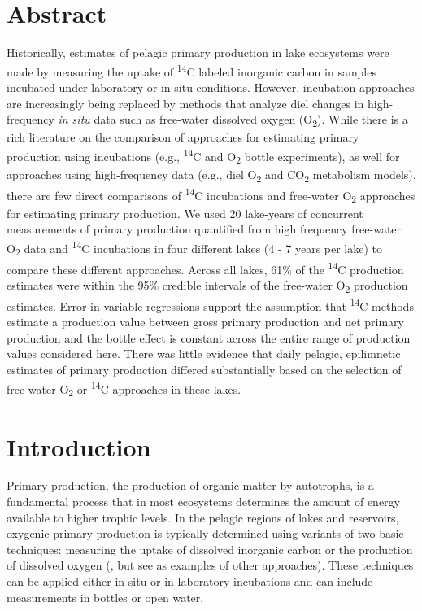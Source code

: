 \documentclass[12pt, oneside]{article}
\begin{document}
\section*{Abstract}
Historically, estimates of pelagic primary production in lake ecosystems were made by measuring the uptake of \textsuperscript{14}C labeled inorganic carbon in samples incubated under laboratory or in situ conditions. However, incubation approaches are increasingly being replaced by methods that analyze diel changes in high-frequency \emph{in situ} data such as free-water dissolved oxygen (O\textsubscript{2}). While there is a rich literature on the comparison of approaches for estimating primary production using incubations (e.g., \textsuperscript{14}C and O\textsubscript{2} bottle experiments), as well for approaches using high-frequency data (e.g., diel O\textsubscript{2} and CO\textsubscript{2} metabolism models), there are few direct comparisons of \textsuperscript{14}C incubations and free-water O\textsubscript{2} approaches for estimating primary production. We used 20 lake-years of concurrent measurements of primary production quantified from high frequency free-water O\textsubscript{2} data and \textsuperscript{14}C incubations in four different lakes (4 - 7 years per lake) to compare these different approaches. Across all lakes, 61\% of the \textsuperscript{14}C production estimates were within the 95\% credible intervals of the free-water O\textsubscript{2} production estimates. Error-in-variable regressions support the assumption that \textsuperscript{14}C methods estimate a production value between gross primary production and net primary production and the bottle effect is constant across the entire range of production values considered here. There was little evidence that daily pelagic, epilimnetic estimates of primary production differed substantially based on the selection of free-water O\textsubscript{2} or \textsuperscript{14}C approaches in these lakes. 

\vspace{\baselineskip}
\newpage

\section*{Introduction}
\label{S:1}
Primary production, the production of organic matter by autotrophs, is a fundamental process that in most ecosystems determines the amount of energy available to higher trophic levels. In the pelagic regions of lakes and reservoirs, oxygenic primary production is typically determined using variants of two basic techniques: measuring the uptake of dissolved inorganic carbon or the production of dissolved oxygen (\citealt{hall_measuring_2007}, but see \citealt{peeters_lake_2016,peeters_calculation_2019} as examples of other approaches). These techniques can be applied either in situ or in laboratory incubations and can include measurements in bottles or open water.
\end{document}
